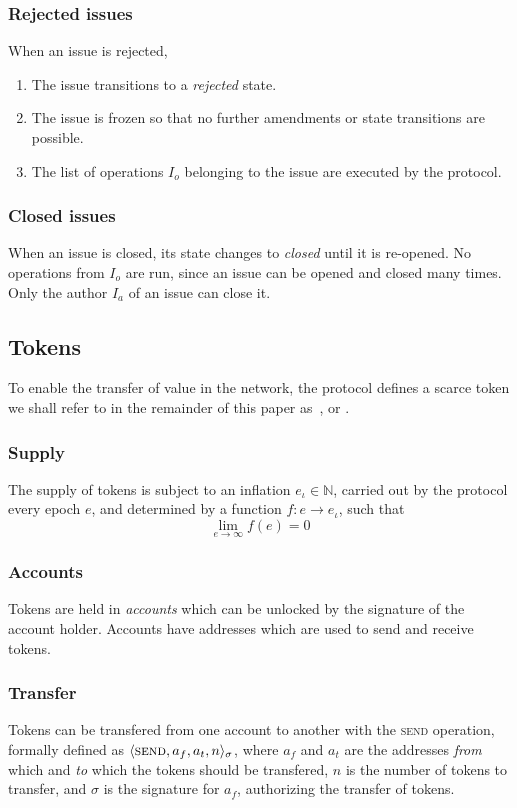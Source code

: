 \subsubsection{Rejected issues} When an issue is rejected,
\begin{enumerate}
    \item The issue transitions to a \emph{rejected} state.
    \item The issue is frozen so that no further amendments or state
        transitions are possible.
    \item The list of operations $I_o$ belonging to the issue are executed by
        the protocol.
\end{enumerate}

\subsubsection{Closed issues} When an issue is closed, its state changes to
\emph{closed} until it is re-opened. No operations from $I_o$ are run, since
an issue can be opened and closed many times. Only the author $I_a$ of an issue
can close it.

\subsection{Tokens}

To enable the transfer of value in the network, the protocol defines a scarce
token we shall refer to in the remainder of this paper as~\token{}, or
\oscoin{}.

\subsubsection{Supply}

The supply of \token{} tokens is subject to an inflation $e_{\iota} \in
\mathbb{N}$, carried out by the protocol every epoch $e$, and determined by a
function $f : e \to e_{\iota}$, such that
\[
    \lim_{e\to\infty} f(e) = 0
\]

\subsubsection{Accounts}

Tokens are held in \emph{accounts} which can be unlocked by the signature of
the account holder. Accounts have addresses which are used to send and receive
tokens.

\subsubsection{Transfer}

Tokens can be transfered from one account to another with the \textsc{send}
operation, formally defined as $\langle \textsc{send}, a_{f}, a_{t}, n
\rangle_{\sigma}$, where $a_{f}$ and $a_{t}$ are the addresses \emph{from}
which and \emph{to} which the tokens should be transfered, $n$ is the number of
tokens to transfer, and $\sigma$ is the signature for $a_{f}$, authorizing the
transfer of tokens.
